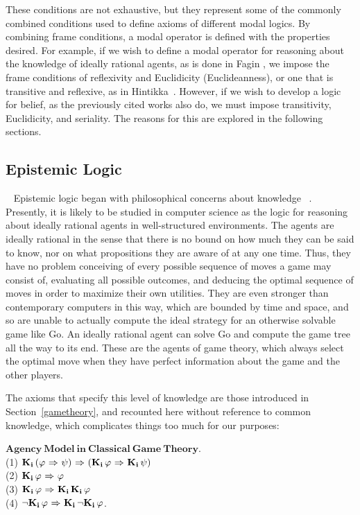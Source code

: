 These conditions are not exhaustive, but they represent some of the commonly combined conditions used to define axioms of different modal logics. By combining frame conditions, a modal operator is defined with the properties desired. For example, if we wish to define a modal operator for reasoning about the knowledge of ideally rational agents, as is done in Fagin \etal\cite{FHMV}, we impose the frame conditions of reflexivity and Euclidicity (Euclideanness), or one that is transitive and reflexive, as in Hintikka~\cite{Hintikka}. However, if we wish to develop a logic for belief, as the previously cited works also do, we must impose transitivity, Euclidicity, and seriality. The reasons for this are explored in the following sections.

\subsection{Epistemic Logic}~\label{epistemic_logic}
Epistemic logic began with philosophical concerns about knowledge ~\cite{FHMV,Hintikka,rescher}. Presently, it is likely to be studied in computer science as the logic for reasoning about ideally rational agents in well-structured environments. The agents are ideally rational in the sense that there is no bound on how much they can be said to know, nor on what propositions they are aware of at any one time. Thus, they have no problem conceiving of every possible sequence of moves a game may consist of, evaluating all possible outcomes, and deducing the optimal sequence of moves in order to maximize their own utilities. They are even stronger than contemporary computers in this way, which are bounded by time and space, and so are unable to actually compute the ideal strategy for an otherwise solvable game like Go. An ideally rational agent can solve Go and compute the game tree all the way to its end. These are the agents of game theory, which always select the optimal move when they have perfect information about the game and the other players.

The axioms that specify this level of knowledge are those introduced in Section~\ref{gametheory}, and recounted here without reference to common knowledge, which complicates things too much for our purposes:

$\mathbf{Agency\  Model\  in\  Classical\  Game\  Theory}$.\\
(1) $\mathbf{K}_{\mathbf{i}}\,(\varphi {\ \Rightarrow \ } \psi) {\ \Rightarrow \ } (\mathbf{K}_{\mathbf{i}}\,\varphi {\ \Rightarrow \ } \mathbf{K}_{\mathbf{i}}\,\psi)$\\
(2) $\mathbf{K}_{\mathbf{i}}\,\varphi {\ \Rightarrow \ } \varphi$\\
(3) $\mathbf{K}_{\mathbf{i}}\,\varphi {\ \Rightarrow \ } \mathbf{K}_{\mathbf{i}}\,\mathbf{K}_{\mathbf{i}}\,\varphi$\\
(4) ${\neg} \mathbf{K}_{\mathbf{i}}\,\varphi {\ \Rightarrow \ } \mathbf{K}_{\mathbf{i}}\,{\neg}\mathbf{K}_{\mathbf{i}}\,\varphi$.

